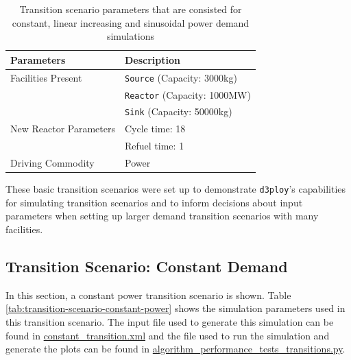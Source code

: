 \documentclass[11pt]{article}
\newcommand{\deploy}{\texttt{d3ploy}\xspace}%
\begin{document}
\begin{table}[!htb]
    \centering
    \caption {Transition scenario parameters that are consisted for constant, linear increasing and sinusoidal power demand simulations}
	\label{tab:transition-scenario-all}
        \begin{tabularx}{0.8\textwidth}{lX}
    \hline
    \textbf{Parameters}    & \textbf{Description} \\ \hline
    Facilities Present     & \texttt{Source} (Capacity: 3000kg)\\
                & \texttt{Reactor} (Capacity: 1000MW)\\
                & \texttt{Sink} (Capacity: 50000kg)      \\ 
                \hline
    New Reactor Parameters & Cycle time: 18\\
                & Refuel time: 1\\
                \hline
    Driving Commodity & Power \\ \hline
    \end{tabularx}
\end{table}

These basic transition scenarios were set up to 
demonstrate \deploy's capabilities for simulating 
transition scenarios and 
to inform decisions about input parameters when setting up larger 
demand transition scenarios with many facilities. 

\subsection{Transition Scenario: Constant Demand}

In this section, a constant power transition scenario is shown. 
Table \ref{tab:transition-scenario-constant-power} shows the 
simulation parameters used in this transition scenario.  
The input file used to generate this simulation can be found in 
\href{https://github.com/arfc/d3ploy/blob/master/input/constant_transition.xml}{constant\_transition.xml} 
and the file used to run the simulation and generate the plots can be found in 
\href{https://github.com/arfc/d3ploy/blob/master/tests/performance_tests/algorithm_performance_tests_transitions.py}{algorithm\_performance\_tests\_transitions.py}.
\end{document}
